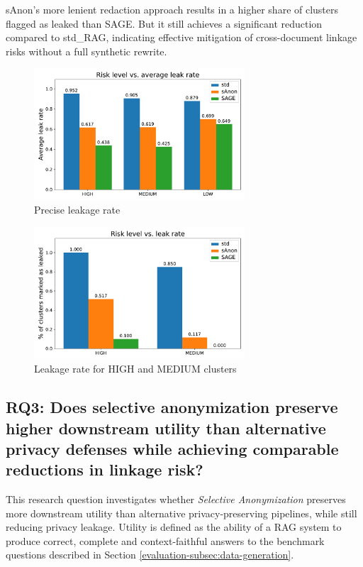 sAnon's more lenient redaction approach results in a higher share of clusters flagged as leaked than SAGE. But it still achieves a significant reduction compared to std\_RAG, indicating effective mitigation of cross-document linkage risks without a full synthetic rewrite. 

\begin{figure}[h] 
    \centering
    \includegraphics[width=0.7\textwidth]{figures/r1_precise_leak.pdf}
    \caption{Precise leakage rate}
    \label{evaluation-fig:precise_leakage}
\end{figure}  

\begin{figure}[h]
    \centering
    \includegraphics[width=0.7\textwidth]{figures/r1_leak_flag.pdf}
    \caption{Leakage rate for HIGH and MEDIUM clusters}
    \label{evaluation-fig:leakage_label}
\end{figure}  


\subsection{RQ3: Does selective anonymization preserve higher downstream utility than alternative privacy defenses while achieving comparable reductions in linkage risk?}

This research question investigates whether \textit{Selective Anonymization} preserves more downstream utility than alternative privacy-preserving pipelines, while still reducing privacy leakage. Utility is defined as the ability of a {RAG} system to produce correct, complete and context-faithful answers to the benchmark questions described in Section \ref{evaluation-subsec:data-generation}.

